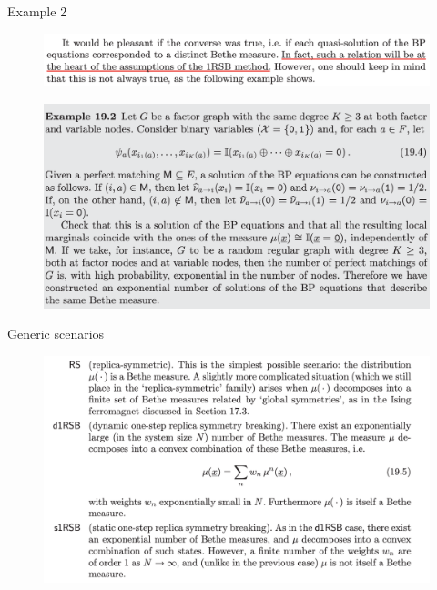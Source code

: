 \documentclass[UTF8]{beamer}
\begin{document}
\begin{frame}{Example 2}
  \begin{minipage}[c]{0.9\linewidth}
    \begin{figure}
      \centering
      \includegraphics[width=0.9\linewidth]{./fig/Exception.png}
    \end{figure}
  \end{minipage}
  \vfill
  \begin{minipage}[c]{0.9\linewidth}
    \begin{figure}
      \centering
      \includegraphics[width=0.85\linewidth]{./fig/Exam_192.png}
    \end{figure}
  \end{minipage}
\end{frame}

\begin{frame}{Generic scenarios}
  \begin{figure}
    \centering
    \includegraphics[width=0.9\linewidth]{./fig/Generic_Scenarios.png}
  \end{figure}
\end{frame}
\end{document}
